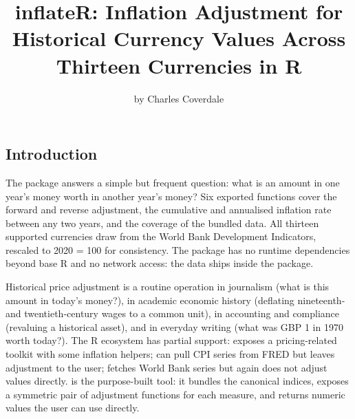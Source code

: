 \title{inflateR: Inflation Adjustment for Historical Currency Values
Across Thirteen Currencies in R}
\author{by Charles Coverdale}

\maketitle


\subsection{Introduction}\label{introduction}

The  package answers a simple but frequent question:
what is an amount in one year's money worth in another year's money? Six
exported functions cover the forward and reverse adjustment, the
cumulative and annualised inflation rate between any two years, and the
coverage of the bundled data. All thirteen supported currencies draw
from the World Bank Development Indicators, rescaled to 2020 = 100 for
consistency. The package has no runtime dependencies beyond base R and
no network access: the data ships inside the package.

Historical price adjustment is a routine operation in journalism (what
is this amount in today's money?), in academic economic history
(deflating nineteenth- and twentieth-century wages to a common unit), in
accounting and compliance (revaluing a historical asset), and in
everyday writing (what was GBP 1 in 1970 worth today?). The R ecosystem
has partial support:  exposes a pricing-related toolkit
with some inflation helpers;  can pull CPI series from
FRED but leaves adjustment to the user;  fetches World Bank
series but again does not adjust values directly.  is
the purpose-built tool: it bundles the canonical indices, exposes a
symmetric pair of adjustment functions for each measure, and returns
numeric values the user can use directly.

